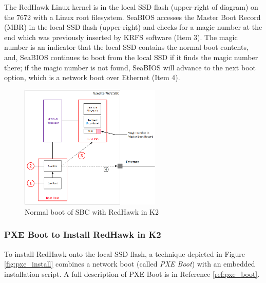 \documentclass[12pt]{article}
\begin{document}
The RedHawk Linux kernel is in the local SSD flash (upper-right of diagram) on
the 7672 with a Linux root filesystem.  SeaBIOS accesses the Master Boot Record
(MBR) in the local SSD flash (upper-right) and checks for a magic number at the
end which was previously inserted by KRFS software (Item 3).  The magic number
is an indicator that the local SSD contains the normal boot contents, and,
SeaBIOS continues to boot from the local SSD if it finds the magic number there;
if the magic number is not found, SeaBIOS will advance to the next boot option,
which is a network boot over Ethernet (Item 4).

\begin{figure}[H]
    \begin{center}
    \includegraphics[width=0.6\textwidth]{img/normal_boot}
    \caption{Normal boot of SBC with RedHawk in K2}
    \label{fig:normal_boot}
    \end{center}
\end{figure}

\subsubsection{PXE Boot to Install RedHawk in K2}
To install RedHawk onto the local SSD flash, a technique depicted
in Figure \ref{fig:pxe_install} combines a network boot (called \emph{PXE Boot})
with an embedded installation script.  A full description of PXE Boot is in
Reference \ref{ref:pxe_boot}.
\end{document}
